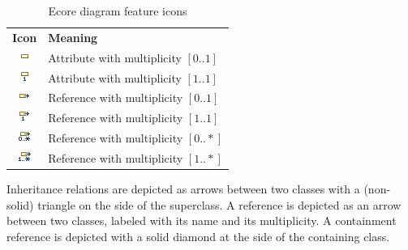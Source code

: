 \begin{table}
\caption{Ecore diagram feature icons}\label{tbl:ecore-feature-icons}
\begin{center}
\begin{tabular}[htb]{@{}|c|@{\quad} l |}
    \hline
    \textbf{Icon} & \textbf{Meaning} \\
    \includegraphics{figures/ecore_icon_attr_01.png} &
      Attribute with multiplicity $[0..1]$ \\
    \includegraphics{figures/ecore_icon_attr_11.png} &
      Attribute with multiplicity $[1..1]$ \\
    \includegraphics{figures/ecore_icon_ref_01.png} &
      Reference with multiplicity $[0..1]$ \\
    \includegraphics{figures/ecore_icon_ref_11.png} &
      Reference with multiplicity $[1..1]$ \\
    \includegraphics{figures/ecore_icon_ref_0x.png} &
      Reference with multiplicity $[0..*]$ \\
    \includegraphics{figures/ecore_icon_ref_1x.png} &
      Reference with multiplicity $[1..*]$ \\
    \hline
\end{tabular}
\end{center}
\end{table}

Inheritance relations are depicted as arrows between two classes with a
(non-solid) triangle on the side of the superclass. A reference is depicted as
an arrow between two classes, labeled with its name and its multiplicity. A
containment reference is depicted with a solid diamond at the side of the
containing class.
